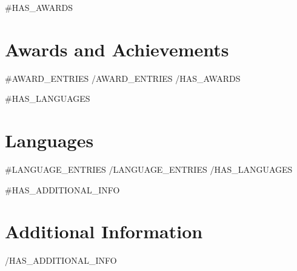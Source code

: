 \documentclass[11pt,a4paper,sans]{moderncv}
\begin{document}
{{#HAS_AWARDS}}
\section{Awards and Achievements}
{{#AWARD_ENTRIES}}
{{/AWARD_ENTRIES}}
{{/HAS_AWARDS}}

{{#HAS_LANGUAGES}}
\section{Languages}
{{#LANGUAGE_ENTRIES}}
{{/LANGUAGE_ENTRIES}}
{{/HAS_LANGUAGES}}

{{#HAS_ADDITIONAL_INFO}}
\section{Additional Information}
{{/HAS_ADDITIONAL_INFO}}
\end{document}
